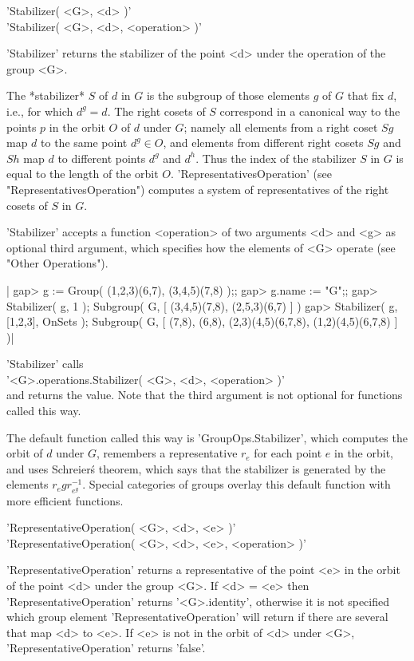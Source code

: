 'Stabilizer( <G>, <d> )' \\
'Stabilizer( <G>, <d>, <operation> )'

'Stabilizer' returns the stabilizer of  the point <d> under the operation
of the group <G>.

The *stabilizer* $S$ of $d$ in $G$ is  the subgroup of those elements $g$
of $G$ that fix $d$, i.e., for which $d^g = d$.   The right cosets of $S$
correspond in a canonical way to  the points $p$ in  the orbit $O$ of $d$
under  $G$; namely all elements  from a right coset  $S g$ map $d$ to the
same  point $d^g \in  O$, and elements from different  right cosets $S g$
and $S h$ map $d$ to different points $d^g$ and $d^h$.  Thus the index of
the stabilizer $S$   in $G$ is equal to    the length of  the orbit  $O$.
'RepresentativesOperation'  (see "RepresentativesOperation")  computes  a
system of representatives of the right cosets of $S$ in $G$.

'Stabilizer' accepts a function <operation> of  two arguments <d> and <g>
as  optional  third argument, which  specifies  how the  elements  of <G>
operate (see "Other Operations").

|    gap> g := Group( (1,2,3)(6,7), (3,4,5)(7,8) );;
    gap> g.name := "G";;
    gap> Stabilizer( g, 1 );
    Subgroup( G, [ (3,4,5)(7,8), (2,5,3)(6,7) ] )
    gap> Stabilizer( g, [1,2,3], OnSets );
    Subgroup( G, [ (7,8), (6,8), (2,3)(4,5)(6,7,8), (1,2)(4,5)(6,7,8) ] )|

'Stabilizer' calls \\
'<G>.operations.Stabilizer( <G>, <d>, <operation> )' \\
and returns the value.  Note that the third argument is  not optional for
functions called this way.

The  default  function called  this  way  is 'GroupOps.Stabilizer', which
computes the orbit of $d$ under $G$, remembers a representative $r_e$ for
each  point $e$ in the  orbit,  and uses Schreier\'s theorem, which  says
that the stabilizer  is generated by  the elements $r_e  g r_{e^g}^{-1}$.
Special categories of  groups overlay  this  default  function with  more
efficient functions.


'RepresentativeOperation( <G>, <d>, <e> )' \\
'RepresentativeOperation( <G>, <d>, <e>, <operation> )'

'RepresentativeOperation' returns a  representative of the  point <e>  in
the  orbit of the point  <d> under the group   <G>.   If <d> =  <e>  then
'RepresentativeOperation' returns   '<G>.identity',  otherwise it  is not
specified which group element   'RepresentativeOperation' will return  if
there are several that map <d> to <e>.  If <e> is not in the orbit of <d>
under <G>, 'RepresentativeOperation' returns 'false'.

